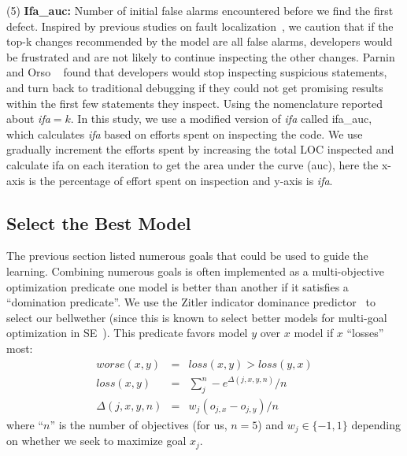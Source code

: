 \documentclass[10pt,journal,compsoc]{IEEEtran}
\begin{document}
{(5) \textbf{Ifa\_auc:} Number of  initial false alarms encountered before we find the first defect. Inspired by previous studies on fault localization~\cite{parnin2011automated, kochhar2016practitioners, xia2016automated}, we caution that if the top-k changes recommended by the model are all false alarms, developers would be frustrated and are not likely to continue inspecting the other changes. Parnin and Orso ~\cite{parnin2011automated} found that developers would stop inspecting suspicious statements, and turn back to traditional debugging if they could not get promising results within the first few statements they inspect. Using the nomenclature reported about {\em ifa$=k$}.  In this study, we use a modified version of {\em ifa} called ifa\_auc, which calculates {\em ifa} based on efforts spent on inspecting the code. We use gradually increment the efforts spent by increasing the total LOC inspected and calculate ifa on each iteration to get the area under the curve (auc), here the x-axis is the percentage of effort spent on inspection and y-axis is {\em ifa}.}


\subsection{Select the Best Model}\label{sec:best}

The previous section listed numerous goals that could be used to guide the learning. Combining
numerous goals is often implemented as a multi-objective optimization predicate  one model is better than another if it
 satisfies a ``domination predicate''.
 We use the Zitler indicator dominance
 predictor~\cite{zit02} to select our bellwether (since this is known to select better models
 for multi-goal optimization in SE~\cite{Sayyad:2013,Sayyad:2013:SPL}).
This predicate favors model
  $y$ over $x$  model if $x$ ``losses'' most:
\begin{equation}\label{eq:cdom}
\begin{array}{rcl}
\textit{worse}(x,y)& =& \textit{loss}(x,y) > \textit{loss}(y,x)\\
\textit{loss}(x,y)& = &\sum_j^n -e^{\Delta(j,x,y,n)}/n\\
\Delta(j,x,y,n) & = & w_j(o_{j,x}  - o_{j,y})/n
\end{array}
\end{equation}
where  ``$n$'' is the number of objectives (for us, $n=5$) and $w_j\in \{-1,1\}$ depending on whether
we seek to maximize goal $x_j$.  
\end{document}
